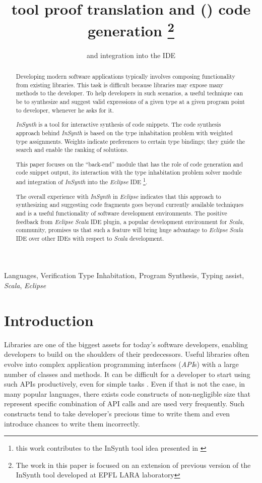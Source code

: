 \documentclass[preprint, nocopyrightspace]{sigplanconf}
\title{\Lang{InSynth} tool proof translation and (\Lang{Scala}) code generation
\thanks{The work in this paper is focused on an extension of previous version of the InSynth tool developed at EPFL LARA laboratory}}
\subtitle{and integration into the \Lang{Eclipse} IDE}
\newcommand\Lang[1]{\textsl{#1}}
\begin{document}
\maketitle

\begin{abstract}
Developing modern software applications typically involves composing functionality from existing libraries.
This task is difficult because libraries may expose many methods to the developer.
To help developers in such scenarios, a useful technique can be to synthesize and suggest valid expressions of a given type at a given program point to developer, whenever he asks for it. 

\Lang{InSynth} is a tool for interactive synthesis of code snippets.
 The code synthesis approach behind \Lang{InSynth} is based on the type inhabitation problem with weighted type assignments. 
Weights indicate preferences to certain type bindings; they guide the search and enable the ranking of solutions.

This paper focuses on the ``back-end'' module that has the role of code generation and code snippet output, its interaction with the type inhabitation problem solver module and integration of \Lang{InSynth} into the \Lang{Eclipse} IDE
\footnote{this work contributes to the InSynth tool idea presented in \cite{EPFL-REPORT-170040}}.

The overall experience with \Lang{InSynth} in \Lang{Eclipse} indicates that this approach to synthesizing and suggesting code fragments goes beyond currently available techniques and is a useful functionality of software development environments.
The positive feedback from \Lang{Eclipse} \Lang{Scala} IDE plugin, a popular development environment for \Lang{Scala}, community, promises us that such a feature will bring huge advantage to \Lang{Eclipse} \Lang{Scala} IDE over other IDEs with respect to \Lang{Scala} development.
\end{abstract}
\terms
Languages, Verification
\keywords
Type Inhabitation, Program Synthesis, Typing assist, \Lang{Scala}, \Lang{Eclipse}

\section{Introduction}
\label{sec:introduction}

Libraries are one of the biggest assets for today’s software developers, enabling developers to build on the shoulders of their predecessors. 
Useful libraries often evolve into complex application programming interfaces (\Lang{API}s) with a large number of classes and methods.
It can be difficult for a developer to start using such APIs productively, even for simple tasks \cite{EPFL-REPORT-170040}.
Even if that is not the case, in many popular languages, there exists code constructs of non-negligible size that represent specific combination of API calls and are used very frequently.
Such constructs tend to take developer's precious time to write them and even introduce chances to write them incorrectly.
\end{document}
